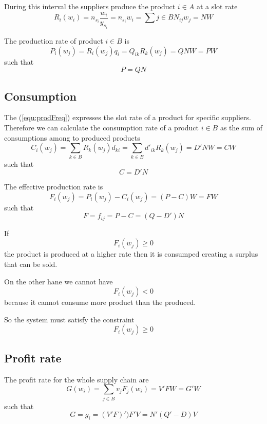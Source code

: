 \documentclass[a4paper,11pt]{article}
\begin{document}
During this interval the suppliers produce the product $ i \in A $ at a slot rate
\begin{equation}
\label{equ:prodFreq}
	R_i(w_i) = n_{s_i} \frac{w_i}{y_{s_i}} = n_{s_i} w_i
	= \sum{j \in B} N_{ij} w_j = N W
\end{equation}

The production rate of product $ i \in B $ is
\begin{equation}
\label{equ:prodRate}
	P_i(w_j) = R_i(w_j) q_i
		= Q_{ik} R_k(w_j)
		= Q N W
		= P W
\end{equation}
such that
\[
	P = Q N
\]

\subsection{Consumption}

The (\ref{equ:prodFreq}) expresses the slot rate of a product for specific suppliers.
Therefore we can calculate the consumption rate of a product $ i \in B$ as the sum of consumptions among to produced products
\begin{equation}
\label{equ:consumRate}
	C_i(w_j) = \sum_{k \in B} R_k(w_j) d_{ki}
			= \sum_{k \in B} d'_{ik} R_k(w_j)
			= D' N W
			= C W
\end{equation}
such that
\[
	C = D' N
\]

The effective production rate is
\[
	F_i(w_j) = P_i(w_j) - C_i(w_j) = (P - C) W = F W
\]
such that
\[
	F = f_{ij} = P - C = (Q - D') N
\]

If
	\[ F_i(w_j) \ge 0 \]
the product is produced at a higher rate then it is consumped creating a surplus that can be sold.

On the other hane we cannot have 
	\[ F_i(w_j) < 0 \]
because it cannot consume more product than the produced.

So the system must satisfy the constraint
\begin{equation}
\label{equ:consumptionConstraint}
	F_i(w_j) \ge 0
\end{equation}
	
\subsection{Profit rate}

The profit rate for the whole supply chain are
\begin{equation}
\label{equ:valueRate}
	G(w_i) =  \sum_{j \in B} v_j F_j(w_i)
	= V' F W
	= G' W
\end{equation}
such that
\[
	G = g_i = (V' F)' ) F' V = N' (Q'-D) V
\]
\end{document}
